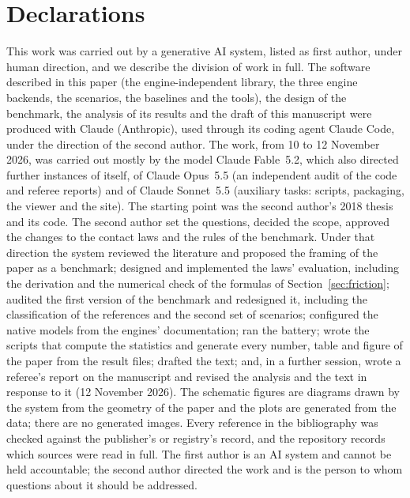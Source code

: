 
\section*{Declarations}

This work was carried out by a generative AI system, listed as first author, under human
direction, and we describe the division of work in full. The software
described in this paper (the engine-independent library, the three engine backends, the
scenarios, the baselines and the tools), the design of the benchmark, the analysis of its
results and the draft of this manuscript were produced with Claude (Anthropic), used through
its coding agent Claude Code, under the direction of the second author. The work, from 10 to 12 November 2026, was carried out mostly by the model
Claude Fable~5.2, which also directed further instances of itself, of Claude Opus~5.5 (an
independent audit of the code and referee reports) and of Claude Sonnet~5.5 (auxiliary tasks:
scripts, packaging, the viewer and the site). The
starting point was the second author's 2018 thesis \cite{Vilela2018} and its code. The second author set the
questions, decided the scope, approved the changes to the contact laws and the rules of the
benchmark. Under that direction the system reviewed the literature and
proposed the framing of the paper as a benchmark; designed and implemented the laws' evaluation,
including the derivation and the numerical check of the formulas of Section~\ref{sec:friction};
audited the first version of the benchmark and redesigned it, including the classification of
the references and the second set of scenarios; configured the native models from the engines'
documentation; ran the battery; wrote the scripts that compute the statistics and generate
every number, table and figure of the paper from the result files; drafted the text; and, in a
further session, wrote a referee's report on the manuscript and revised the analysis and the
text in response to it (12 November 2026). The
schematic figures are diagrams drawn by the system from the geometry of the paper and the plots are generated
from the data; there are no generated images. Every reference in the bibliography was checked
against the publisher's or registry's record, and the repository records which sources were
read in full. The first author is an AI system and cannot be held accountable; the second author
directed the work and is the person to whom questions about it should be addressed.

